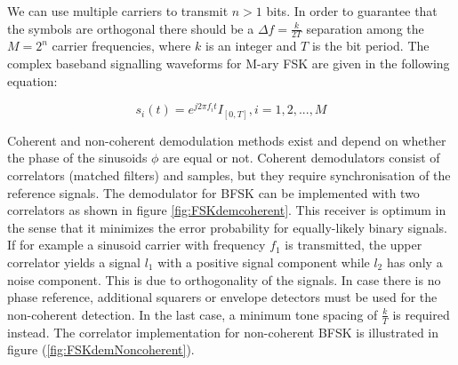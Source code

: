 \documentclass[12pt,a4paper,openright]{report}
\begin{document}
We can use multiple carriers to transmit $n>1$ bits. In order to guarantee that the symbols are orthogonal there should be a $\Delta f=\frac{k}{2T}$ separation among the  $M=2^n$ carrier frequencies, where $k$ is an integer and $T$ is the bit period. The complex baseband signalling waveforms for M-ary FSK \cite{Madhow} are given in the following equation:

\begin{equation}\label{Eq:M-FSK symbols}
{s_i}(t) = {e^{j2\pi {f_i}t}}{I_{[0,T]}},i = 1,2,...,M
\end{equation}



Coherent and non-coherent demodulation methods exist and depend on whether the phase of the sinusoids $\phi$ are equal or not. Coherent demodulators consist of correlators (matched filters) and samples, but they require synchronisation of the reference signals. The demodulator for BFSK can be implemented with two correlators as shown in figure \ref{fig:FSKdemcoherent}. This receiver is optimum in the sense that it minimizes the error probability for equally-likely binary signals. If for example a sinusoid carrier with frequency $f_1$ is transmitted, the upper correlator yields a signal $l_1$ with a positive signal component while $l_2$ has only a noise component. This is due to orthogonality of the signals.
  In case there is no phase reference, additional squarers or envelope detectors must be used for the non-coherent detection. In the last case, a minimum tone spacing of $\frac{k}{T}$ is required instead. The correlator implementation for non-coherent BFSK is illustrated in figure (\ref{fig:FSKdemNoncoherent}).
\end{document}
